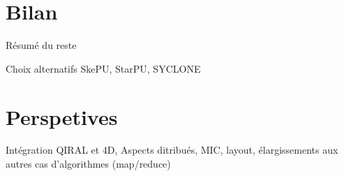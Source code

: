 \documentclass[11pt,onecolumn]{report}
\begin{document}
\section{Bilan}

Résumé du reste

Choix alternatifs SkePU, StarPU, SYCLONE


\section{Perspetives}

Intégration QIRAL et 4D, Aspects ditribués, MIC, layout, élargissements aux autres cas d'algorithmes (map/reduce)


\nocite{*} %


\end{document}
